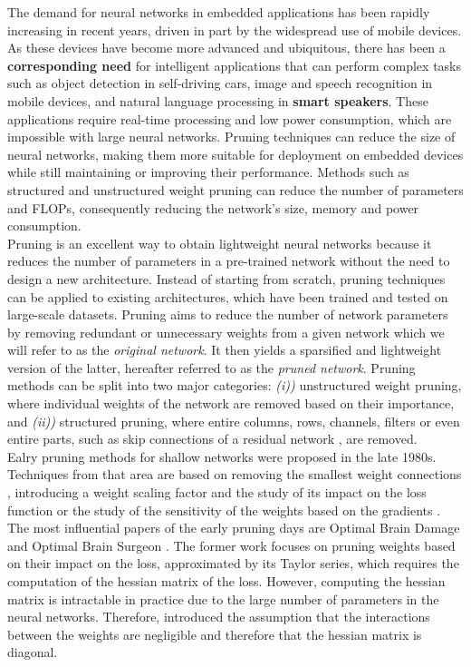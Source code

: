 The demand for neural networks in embedded applications has been rapidly
increasing in recent years, driven in part by the widespread use of mobile
devices. As these devices have become more advanced and ubiquitous, there has
been a \textbf{corresponding need} for intelligent applications that can perform complex
tasks such as object detection in self-driving cars, image and speech
recognition in mobile devices, and natural language processing in \textbf{smart
speakers}. These applications require real-time processing and low power
consumption, which are impossible with large neural networks. Pruning techniques
can reduce the size of neural networks, making them more suitable for deployment
on embedded devices while still maintaining or improving their performance.
Methods such as structured and unstructured weight pruning can reduce the number
of parameters and \acp{FLOP}, consequently reducing the network's size, memory
and power consumption.\\


Pruning is an excellent way to obtain lightweight neural networks because it
reduces the number of parameters in a pre-trained network without the need to
design a new architecture. Instead of starting from scratch, pruning techniques
can be applied to existing architectures, which have been trained and tested on
large-scale datasets. Pruning aims to reduce the number of network parameters by
removing redundant or unnecessary weights from a given network which we will
refer to as the \textit{original network}. It then yields a sparsified and
lightweight version of the latter, hereafter referred to as the \textit{pruned
network}. Pruning methods can be split into two major categories: \textit{(i))}
unstructured weight pruning, where individual weights of the network are removed
based on their importance, and \textit{(ii))} structured pruning, where entire
columns, rows, channels, filters or even entire parts, such as skip connections
of a residual network \cite{DBLP:conf/cvpr/HeZRS16}, are removed. \\


Ealry pruning methods for shallow networks were proposed in the late 1980s.
Techniques from that area are based on removing the smallest weight connections
\cite{janowsky1989pruning}, introducing a weight scaling factor and the study of
its impact on the loss function \cite{DBLP:conf/nips/MozerS88} or the study of
the sensitivity of the weights based on the gradients
\cite{DBLP:journals/tnn/Karnin90}. The most influential papers of the early
pruning days are Optimal Brain Damage \cite{DBLP:conf/nips/CunDS89} and Optimal
Brain Surgeon
\cite{DBLP:conf/nips/HassibiS92,DBLP:conf/nips/HassibiSW93,DBLP:conf/icnn/HassibiSW93}.
The former work focuses on pruning weights based on their impact on the loss,
approximated by its Taylor series, which requires the computation of the hessian
matrix of the loss. However, computing the hessian matrix is intractable in
practice due to the large number of parameters in the neural networks.
Therefore, \citeauthor{DBLP:conf/icnn/HassibiSW93} introduced the assumption
that the interactions between the weights are negligible and therefore that the
hessian matrix is diagonal.\\


